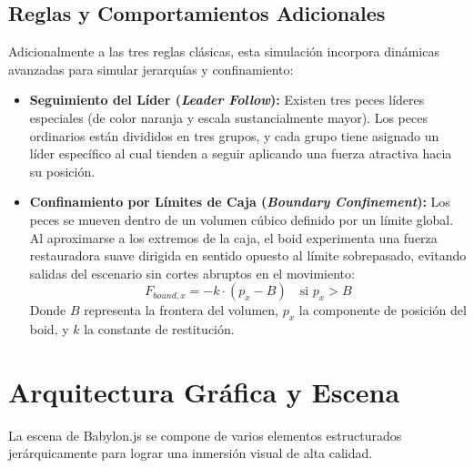 \documentclass[12pt,a4paper]{article}
\begin{document}
\subsection{Reglas y Comportamientos Adicionales}
Adicionalmente a las tres reglas clásicas, esta simulación incorpora dinámicas avanzadas para simular jerarquías y confinamiento:
\begin{itemize}
    \item \textbf{Seguimiento del Líder (\textit{Leader Follow}):} Existen tres peces líderes especiales (de color naranja y escala sustancialmente mayor). Los peces ordinarios están divididos en tres grupos, y cada grupo tiene asignado un líder específico al cual tienden a seguir aplicando una fuerza atractiva hacia su posición.
    \item \textbf{Confinamiento por Límites de Caja (\textit{Boundary Confinement}):} Los peces se mueven dentro de un volumen cúbico definido por un límite global. Al aproximarse a los extremos de la caja, el boid experimenta una fuerza restauradora suave dirigida en sentido opuesto al límite sobrepasado, evitando salidas del escenario sin cortes abruptos en el movimiento:
    \begin{equation}
        F_{bound, x} = -k \cdot (p_x - B) \quad \text{si } p_x > B
    \end{equation}
    Donde $B$ representa la frontera del volumen, $p_x$ la componente de posición del boid, y $k$ la constante de restitución.
\end{itemize}

\newpage
\section{Arquitectura Gráfica y Escena}
La escena de Babylon.js se compone de varios elementos estructurados jerárquicamente para lograr una inmersión visual de alta calidad.
\end{document}
